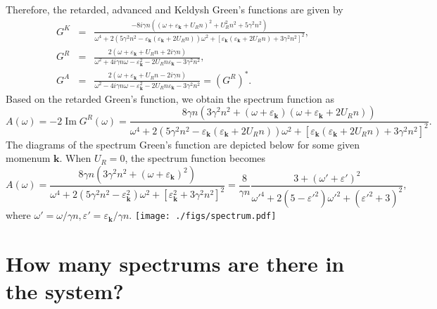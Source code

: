 \documentclass[aps,onecolumn,superscriptaddress,notitlepage,longbibliography]{revtex4-1}
\newcommand{\tmmathbf}[1]{\ensuremath{\boldsymbol{#1}}}
\newcommand{\tmop}[1]{\ensuremath{\operatorname{#1}}}
\begin{document}
Therefore, the retarded, advanced and Keldysh Green's functions are given by
\begin{eqnarray}
  G^K & = & \frac{- 8 i \gamma n ((\omega + \varepsilon_{\tmmathbf{k}} + U_R
  n)^2 + U_R^2 n^2 + 5 \gamma^2 n^2)}{\omega^4 + 2 (5 \gamma^2 n^2 -
  \varepsilon_{\tmmathbf{k}} (\varepsilon_{\tmmathbf{k}} + 2 U_R n)) \omega^2
  + [\varepsilon_{\tmmathbf{k}} (\varepsilon_{\tmmathbf{k}} + 2 U_R n) + 3
  \gamma^2 n^2]^2}, \\
  G^R & = & \frac{2 (\omega + \varepsilon_{\tmmathbf{k}} + U_R n + 2 i \gamma
  n)}{\omega^2 + 4 i \gamma n \omega - \varepsilon_{\tmmathbf{k}}^2 - 2 U_R n
  \varepsilon_{\tmmathbf{k}} - 3 \gamma^2 n^2}, \\
  G^A & = & \frac{2 (\omega + \varepsilon_{\tmmathbf{k}} + U_R n - 2 i \gamma
  n)}{\omega^2 - 4 i \gamma n \omega - \varepsilon_{\tmmathbf{k}}^2 - 2 U_R n
  \varepsilon_{\tmmathbf{k}} - 3 \gamma^2 n^2} = (G^R)^{\ast} . 
\end{eqnarray}
Based on the retarded Green's function, we obtain the spectrum function as
\begin{equation}
  A (\omega) = - 2 \tmop{Im} G^R (\omega) = \frac{8 \gamma n (3 \gamma^2 n^2 +
  (\omega + \varepsilon_{\tmmathbf{k}}) (\omega + \varepsilon_{\tmmathbf{k}} +
  2 U_R n))}{\omega^4 + 2 (5 \gamma^2 n^2 - \varepsilon_{\tmmathbf{k}}
  (\varepsilon_{\tmmathbf{k}} + 2 U_R n)) \omega^2 +
  [\varepsilon_{\tmmathbf{k}} (\varepsilon_{\tmmathbf{k}} + 2 U_R n) + 3
  \gamma^2 n^2]^2} .
\end{equation}
The diagrams of the spectrum Green's function are depicted below for some
given momenum $\tmmathbf{k}$. When $U_R = 0$, the spectrum function becomes
\begin{equation}
  A (\omega) = \frac{8 \gamma n (3 \gamma^2 n^2 + (\omega +
  \varepsilon_{\tmmathbf{k}})^2)}{\omega^4 + 2 (5 \gamma^2 n^2 -
  \varepsilon_{\tmmathbf{k}}^2) \omega^2 + [\varepsilon_{\tmmathbf{k}}^2 + 3
  \gamma^2 n^2]^2} = \frac{8}{\gamma n} \frac{3 + (\omega' +
  \varepsilon')^2}{{\omega'}^4 + 2 \left( {5 - \varepsilon'}^2 \right)
  {\omega'}^2 + \left( {\varepsilon'}^2 + 3 \right)^2},
\end{equation}
where $\omega' = \omega / \gamma n, \varepsilon' = \varepsilon_{\tmmathbf{k}}
/ \gamma n$.
\texttt{[image: ./figs/spectrum.pdf]}

\section{How many spectrums are there in the system?}
\end{document}
